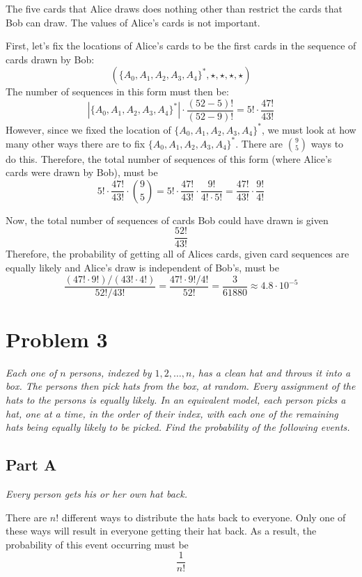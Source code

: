 \documentclass{article}
\begin{document}
\bigbreak

The five cards that Alice draws does nothing other than restrict the cards that
Bob can draw. The values of Alice's cards is not important.

First, let's fix the locations of Alice's cards to be the first cards in the
sequence of cards drawn by Bob:
$$ ( \{ A_0, A_1, A_2, A_3, A_4 \}^*, \star, \star, \star, \star ) $$
The number of sequences in this form must then be:
$$ | \{ A_0, A_1, A_2, A_3, A_4 \}^* | \cdot \frac{(52 - 5)!}{(52 - 9)!} = 5!
\cdot \frac{47!}{43!} $$
However, since we fixed the location of $ \{ A_0, A_1, A_2, A_3, A_4 \}^* $,
we must look at how many other ways there are to fix $ \{ A_0, A_1, A_2, A_3,
A_4 \}^* $. There are $ \binom{9}{5} $ ways to do this. Therefore, the total
number of sequences of this form (where Alice's cards were drawn by Bob),
must be
$$ 5! \cdot \frac{47!}{43!} \cdot \binom{9}{5} = 5! \cdot \frac{47!}{43!}
\cdot \frac{9!}{4! \cdot 5!} = \frac{47!}{43!} \cdot \frac{9!}{4!} $$

Now, the total number of sequences of cards Bob could have drawn is given
$$ \frac{52!}{43!} $$
Therefore, the probability of getting all of Alices cards, given card sequences
are equally likely and Alice's draw is independent of Bob's, must be
$$ \frac{(47! \cdot 9!) / (43! \cdot 4!)}{52! / 43!} = \frac{ 47! \cdot 9! /
4! }{ 52! } = \frac{3}{61880} \approx 4.8 \cdot 10^{-5} $$

\section*{Problem 3}

\textit{Each one of $ n $ persons, indexed by $ 1, 2, \ldots, n $, has a
clean hat and throws it into a box. The persons then pick hats from the box,
at random. Every assignment of the hats to the persons is equally likely. In
an equivalent model, each person picks a hat, one at a time, in the order of
their index, with each one of the remaining hats being equally likely to be
picked. Find the probability of the following events.}

\subsection*{Part A}

\textit{Every person gets his or her own hat back.}

\bigbreak

There are $ n! $ different ways to distribute the hats back to everyone. Only
one of these ways will result in everyone getting their hat back. As a result,
the probability of this event occurring must be
$$ \frac{1}{n!} $$
\end{document}
